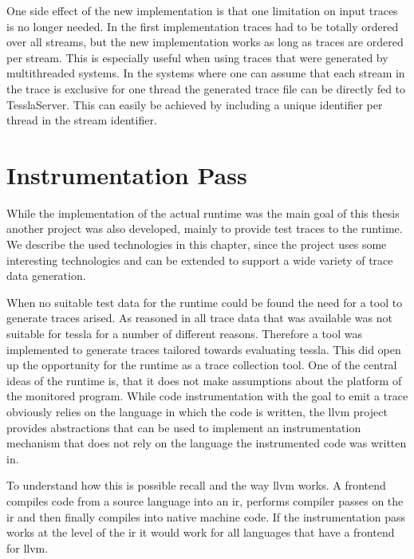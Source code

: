 One side effect of the new implementation is that one limitation on input traces is no longer needed.
In the first implementation traces had to be totally ordered over all streams, but the new implementation works as long as traces are ordered per stream.
This is especially useful when using traces that were generated by multithreaded systems.
In the systems where one can assume that each stream in the trace is exclusive for one thread the generated trace file can be directly fed to TesslaServer.
This can easily be achieved by including a unique identifier per thread in the stream identifier.

\section{Instrumentation Pass}
\label{sec:implementation:instrumentation}

While the implementation of the actual runtime was the main goal of this thesis another project was also developed, mainly to provide test traces to the runtime.
We describe the used technologies in this chapter, since the project uses some interesting technologies and can be extended to support a wide variety of trace data generation.

When no suitable test data for the runtime could be found the need for a tool to generate traces arised.
As reasoned in  all trace data that was available was not suitable for \gls{tessla} for a number of different reasons.
Therefore a tool was implemented to generate traces tailored towards evaluating \gls{tessla}.
This did open up the opportunity for the runtime as a trace collection tool.
One of the central ideas of the runtime is, that it does not make assumptions about the platform of the monitored program.
While code instrumentation with the goal to emit a trace obviously relies on the language in which the code is written, the \gls{llvm} project provides abstractions that can be used to implement an instrumentation mechanism that does not rely on the language the instrumented code was written in.

To understand how this is possible recall  and the way \gls{llvm} works.
A frontend compiles code from a source language into an \gls{ir}, performs compiler passes on the \gls{ir} and then finally compiles into native machine code.
If the instrumentation pass works at the level of the \gls{ir} it would work for all languages that have a frontend for \gls{llvm}.

